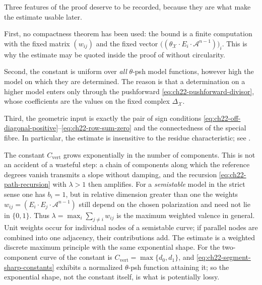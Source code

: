 \begin{remark}
\label{rem:ch22-vertex-estimate-nature}
Three features of the proof deserve to be recorded, because they are what
make the estimate usable later.

First, no compactness theorem has been used: the bound is a finite
computation with the fixed matrix $(w_{ij})$ and the fixed vector
$\bigl((\theta_{\mathcal X}\cdot E_i\cdot\mathcal A^{n-1})\bigr)_i$.  This
is why the estimate may be quoted inside the proof of
 without circularity.

Second, the constant is uniform over \emph{all} $\theta$-psh model
functions, however high the model on which they are determined.  The reason
is that a determination on a higher model enters only through the
pushforward \eqref{eq:ch22-pushforward-divisor}, whose coefficients are the
values on the fixed complex $\Delta_{\mathcal X}$.

Third, the geometric input is exactly the pair of sign conditions
\eqref{eq:ch22-off-diagonal-positive}--\eqref{eq:ch22-row-sum-zero} and the
connectedness of the special fibre.  In particular, the estimate is
insensitive to the residue characteristic; see
.
\end{remark}

\begin{remark}
\label{rem:ch22-exponential-constant}
The constant $C_{\mathrm{vert}}$ grows exponentially in the number of
components.  This is not an accident of a wasteful step: a chain of
components along which the reference degrees vanish transmits a slope
without damping, and the recursion \eqref{eq:ch22-path-recursion} with
$\lambda>1$ then amplifies.  For a \emph{semistable} model in the strict
sense one has $b_i=1$, but in relative dimension greater than one the
weights
$w_{ij}=(E_i\cdot E_j\cdot\mathcal A^{n-1})$ still depend on the chosen
polarization and need not lie in $\{0,1\}$.  Thus
$\lambda=\max_i\sum_{j\ne i}w_{ij}$ is the maximum weighted valence in
general.  Unit weights occur for individual nodes of a semistable curve; if
parallel nodes are combined into one adjacency, their contributions add.
The estimate is a weighted discrete maximum principle with the same
exponential shape.  For the two-component curve of
 the constant is $C_{\mathrm{vert}}=
\max\{d_0,d_1\}$, and \eqref{eq:ch22-segment-sharp-constants} exhibits a
normalized $\theta$-psh function attaining it; so the exponential shape,
not the constant itself, is what is potentially lossy.
\end{remark}

